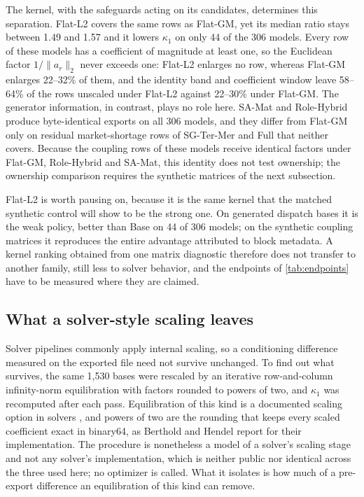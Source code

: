 \documentclass[11pt]{article}
\theoremstyle{definition}
\theoremstyle{remark}
\begin{document}
The kernel, with the safeguards acting on its candidates, determines this separation. Flat-L2
covers the same rows as Flat-GM, yet its median
ratio stays between 1.49 and 1.57 and it lowers $\kappa_1$ on only 44 of the 306 models. Every
row of these models has a coefficient of magnitude at least one, so the Euclidean factor
$1/\|a_r\|_2$ never exceeds one: Flat-L2 enlarges no row, whereas Flat-GM enlarges 22--32\% of
them, and the identity band and coefficient window leave 58--64\% of the rows unscaled under
Flat-L2 against 22--30\% under Flat-GM. The generator information, in contrast, plays no role
here. SA-Mat and Role-Hybrid produce byte-identical exports on all 306 models, and they differ
from Flat-GM only on residual market-shortage rows of SG-Ter-Mer and Full that neither covers.
Because the coupling rows of these models receive identical factors under Flat-GM, Role-Hybrid and
SA-Mat, this identity does not test ownership; the ownership comparison requires the synthetic
matrices of the next subsection.

Flat-L2 is worth pausing on, because it is the same kernel that the matched synthetic control
will show to be the strong one. On generated dispatch bases it is the weak policy, better than
Base on 44 of 306 models; on the synthetic coupling matrices it reproduces the entire advantage
attributed to block metadata. A kernel ranking obtained from one matrix diagnostic therefore
does not transfer to another family, still less to solver behavior, and the endpoints of
\cref{tab:endpoints} have to be measured where they are claimed.

\subsection{What a solver-style scaling leaves}
\label{subsec:results-bridge}
Solver pipelines commonly apply internal scaling, so a conditioning difference measured on the
exported file need not survive unchanged. To find out what survives, the same 1,530 bases were
rescaled by an iterative row-and-column infinity-norm equilibration with factors rounded to
powers of two, and $\kappa_1$ was recomputed after each pass. Equilibration of this kind is a
documented scaling option in solvers \cite{gurobiScaling,berthold2021scaling}, and powers of two
are the rounding that keeps every scaled coefficient exact in binary64, as Berthold and Hendel
\cite{berthold2021scaling} report for their implementation. The procedure is nonetheless a
model of a solver's scaling stage and not any solver's implementation, which is neither public
nor identical across the three used here; no optimizer is called. What it isolates is how much
of a pre-export difference an equilibration of this kind can remove.
\end{document}
